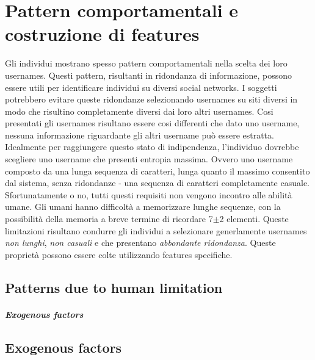 \chapter{Pattern comportamentali e costruzione di features}
\label{cap2}
Gli individui mostrano spesso pattern comportamentali nella scelta dei loro usernames. Questi pattern, risultanti in ridondanza di informazione, possono essere utili per identificare individui su diversi social networks.
I soggetti potrebbero evitare queste ridondanze selezionando usernames su siti diversi in modo che risultino completamente diversi dai loro altri usernames. Cosi presentati gli usernames risultano essere cosi differenti che dato uno username, nessuna informazione riguardante gli altri username può essere estratta.
Idealmente per raggiungere questo stato di indipendenza, l'individuo dovrebbe scegliere uno username che presenti entropia massima. Ovvero uno username composto da una lunga sequenza di caratteri, lunga quanto il massimo consentito dal sistema, senza ridondanze - una sequenza di caratteri completamente casuale.
Sfortunatamente o no, tutti questi requisiti non vengono incontro alle abilità umane. Gli umani hanno difficoltà a memorizzare lunghe sequenze, con la possibilità della memoria a breve termine di ricordare 7$\pm$2 elementi. Queste limitazioni risultano condurre gli individui a selezionare generlamente usernames \textit{non lunghi}, \textit{non casuali} e che presentano \textit{abbondante ridondanza}.
Queste proprietà possono essere colte utilizzando features specifiche.
\section{Patterns due to human limitation}
\paragraph{Exogenous factors}
\section{Exogenous factors}
